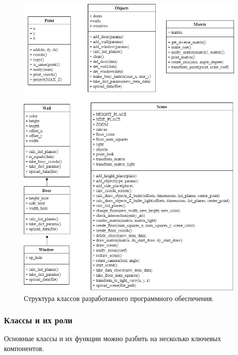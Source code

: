 \begin{figure}[h!]
    \centering
    \includegraphics[width=1\textwidth]{img/class_UML.png}
    \caption{Структура классов разработанного программного обеспечения.}
    \label{fig:class_UML}
\end{figure}

\subsubsection{Классы и их роли}

\hspace{1.25cm}
Основные классы и их функции можно разбить на несколько ключевых компонентов.

